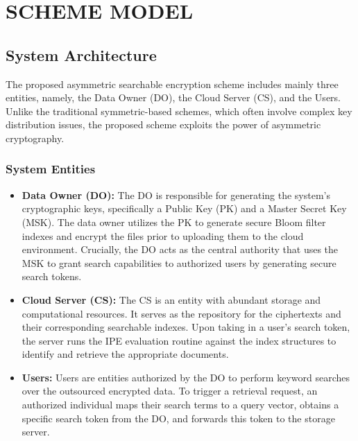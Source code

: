 \chapter{SCHEME MODEL}
\graphicspath{{Chapter2/}}

\section{System Architecture}
The proposed asymmetric searchable encryption scheme includes mainly three entities, namely, the Data Owner (DO), the Cloud Server (CS), and the Users. Unlike the traditional symmetric-based schemes, which often involve complex key distribution issues, the proposed scheme exploits the power of asymmetric cryptography. 

\subsection{System Entities}
\begin{itemize}
    \item \textbf{Data Owner (DO):} The DO is responsible for generating the system's cryptographic keys, specifically a Public Key (PK) and a Master Secret Key (MSK). The data owner utilizes the PK to generate secure Bloom filter indexes and encrypt the files prior to uploading them to the cloud environment. 
    Crucially, the DO acts as the central authority that uses the MSK to grant search capabilities to authorized users by generating secure search tokens.
    \item \textbf{Cloud Server (CS):} The CS is an entity with abundant storage and computational resources. It serves as the repository for the ciphertexts and their corresponding searchable indexes. Upon taking in a user's search token, the server runs the IPE evaluation routine against the index structures to identify and retrieve the appropriate documents.
    \item \textbf{Users:} Users are entities authorized by the DO to perform keyword searches over the outsourced encrypted data. To trigger a retrieval request, an authorized individual maps their search terms to a query vector, obtains a specific search token from the DO, and forwards this token to the storage server.
\end{itemize}

